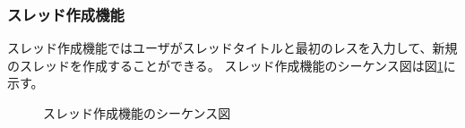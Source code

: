 \documentclass[a4j]{jarticle}
\begin{document}
  \subsubsection{スレッド作成機能}
  スレッド作成機能ではユーザがスレッドタイトルと最初のレスを入力して、新規のスレッドを作成することができる。
  スレッド作成機能のシーケンス図は図\ref{fig:bbs_thread.png}に示す。
  \begin{figure}[H]
    \centering
    \caption{スレッド作成機能のシーケンス図}
    \label{fig:bbs_thread.png}
  \end{figure}
\end{document}
